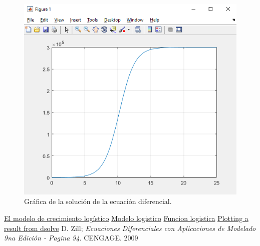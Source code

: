 \documentclass[12pt]{report}
\begin{document}
\begin{figure}[H]
\centering
\includegraphics[scale=0.9]{IMAGEN GRAFICA SOLUCION.png}
\caption{Gráfica de la solución de la ecuación diferencial.}\label{IMAGEN GRAFICA SOLUCION}
\end{figure}
\newpage

\begin{thebibliography}{10}
 \href{https://es.khanacademy.org/math/ap-calculus-bc/bc-differential-equations-new/bc-7-9/v/logistic-differential-equation-intuition#:~:text=La%20ecuaci%C3%B3n%20diferencial%20log%C3%ADstica%20dN,cuando%20alcanza%20el%20tama%C3%B1o%20K.}{El modelo de crecimiento logístico}
 \href{https://sites.google.com/site/rgnecuacionesdiferenciales/home/parcial-3/modelo-logistico}{Modelo logistico}
 \href{https://es.wikipedia.org/wiki/Funci%C3%B3n_log%C3%ADstica}{Funcion logistica}
 \href{https://www.mathworks.com/matlabcentral/answers/351952-plotting-a-result-from-dsolve}{Plotting a result from dsolve}
 D. Zill; {\it Ecuaciones Diferenciales con  Aplicaciones de Modelado 9na Edición - Pagina 94}. CENGAGE. 2009
\end{thebibliography}
\end{document}
